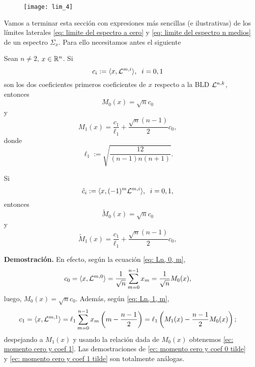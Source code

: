 \begin{figure}[H]
	\centering
	\texttt{[image: lim\_4]} 
\end{figure}


Vamos a terminar esta sección con expresiones
más sencillas (e ilustrativas) de los límites
laterales \eqref{eq: limite del espectro a cero}
y \eqref{eq: limite del espectro n medios}
de un espectro $\Sigma_{x}$.
Para ello necesitamos antes el siguiente
\begin{lema}
Sean $n \neq 2$, $x \in \mathbb{R}^{n}$.
Si
\[
c_{i} := \langle x, \mathcal{L}^{m,i} \rangle,
\hspace{0.2cm} i = 0,1
\]
son los dos coeficientes primeros coeficientes
de $x$ respecto a la BLD $\mathcal{L}^{n,k}$,
entonces 
\begin{equation}
\label{ec: momento cero y coef 0}
M_{0}(x) = \sqrt{n} c_{0}
\end{equation}
y
 \begin{equation}
\label{ec: momento cero y coef 1}
M_{1}(x) = \frac{c_{1}}{\ell_{1}} + 
\frac{\sqrt{n}(n-1)}{2}c_{0},
\end{equation}
donde
\begin{equation}
\label{ec: l1}
\ell_{1}:= \sqrt{\frac{
12
}{(n-1)n(n+1)}}.
\end{equation}


Si 
\[
\tilde{c}_{i} := \langle x, (-1)^{m}\mathcal{L}^{m,i} \rangle,
\hspace{0.2cm} i = 0,1,
\]
entonces
\begin{equation}
\label{ec: momento cero y coef 0 tilde}
\tilde{M}_{0}(x) = \sqrt{n} c_{0}
\end{equation}
y
 \begin{equation}
\label{ec: momento cero y coef 1 tilde}
\tilde{M}_{1}(x) = \frac{c_{1}}{\ell_{1}} + 
\frac{\sqrt{n}(n-1)}{2}c_{0},
\end{equation}
\end{lema}
\noindent
\textbf{Demostración.}
En efecto, según la ecuación
\eqref{eq: Ln, 0, m}, 
\[
c_{0}= 
\langle x, \mathcal{L}^{m,0} \rangle
= \frac{1}{\sqrt{n}} \sum\limits_{m=0}^{n-1}x_{m}
= \frac{1}{\sqrt{n}} M_{0}(x),
\]
luego, 
$M_{0}(x) = \sqrt{n} c_{0}$.
Además, según \eqref{eq: Ln, 1, m},
\[
c_{1}= 
\langle x, \mathcal{L}^{m,1} \rangle
= \ell_{1} \sum\limits_{m=0}^{n-1}x_{m} \left(
m-  \frac{n-1}{2}
\right)
= \ell_{1} \left(
M_{1}(x)-\frac{n-1}{2}M_{0}(x)
\right);
\]
despejando a $M_{1}(x)$ y usando la relación dada
de $M_{0}(x)$ obtenemos 
\eqref{ec: momento cero y coef 1}.
Las demostraciones de 
\eqref{ec: momento cero y coef 0 tilde} y 
\eqref{ec: momento cero y coef 1 tilde} son
totalmente análogas.
\QEDB
\vspace{0.2cm}

